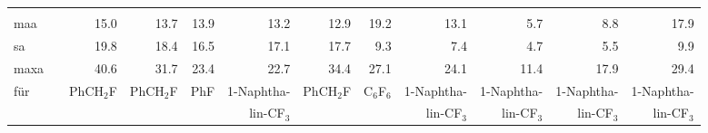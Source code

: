 \begin{table}[ht!]
{\begin{tabular}{lr|rrrrr|rrrrr}
          &       &       &       &       &       &       &       &       &       &       &  \\
    \ac{maa}   &       & 15.0  & 13.7  & 13.9  & 13.2  & 12.9  & 19.2  & 13.1  & 5.7   & 8.8   & 17.9 \\
    \ac{sa}   &       & 19.8  & 18.4  & 16.5  & 17.1  & 17.7  & 9.3   & 7.4   & 4.7   & 5.5   & 9.9 \\
    \ac{maxa}  &       & 40.6  & 31.7  & 23.4  & 22.7  & 34.4  & 27.1  & 24.1  & 11.4  & 17.9  & 29.4 \\
    für   &       & PhCH$_{2}$F & PhCH$_{2}$F & PhF   & 1-Naphtha- & PhCH$_{2}$F & C$_{6}$F$_{6}$  & 1-Naphtha- & 1-Naphtha- & 1-Naphtha- & 1-Naphtha- \\

          &       &             &             &       & lin-CF$_{3}$\;\;\; &             &                 & lin-CF$_{3}$\;\;\; & lin-CF$_{3}$\;\;\; & lin-CF$_{3}$\;\;\; & lin-CF$_{3}$\;\;\; \\
    \end{tabular}%
  \label{tab:fshifts}}%
\end{table}%


